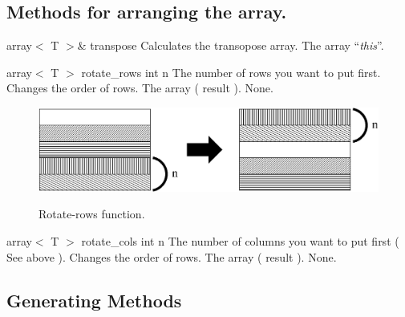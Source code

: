 \clearpage

\subsection{Methods for arranging the array.}

\setNormalInstance
\printEmptyMethodReturn
{array$<$ T $>$\&}
{transpose}
{Calculates the transopose array.}
{The array ``{\em this}''.}

\setConstInstance
\printMethodWithOneParam
{array$<$ T $>$}
{rotate\_rows}
{int}
{n}
{The number of rows you want to put first.}
{Changes the order of rows.}
{The array ( result ).}
{None.}

\begin{center}
\begin{figure}[h]
\includegraphics[width=12cm]{rotate-rows.eps}\\
\caption{Rotate-rows function.}
\end{figure}
\end{center}

\vspace*{-5mm}

\setNormalInstance
\printMethodWithOneParam
{array$<$ T $>$}
{rotate\_cols}
{int}
{n}
{The number of columns you want to put first ( See above ).}
{Changes the order of rows.}
{The array ( result ).}
{None.}

\clearpage

\subsection{Generating Methods}

